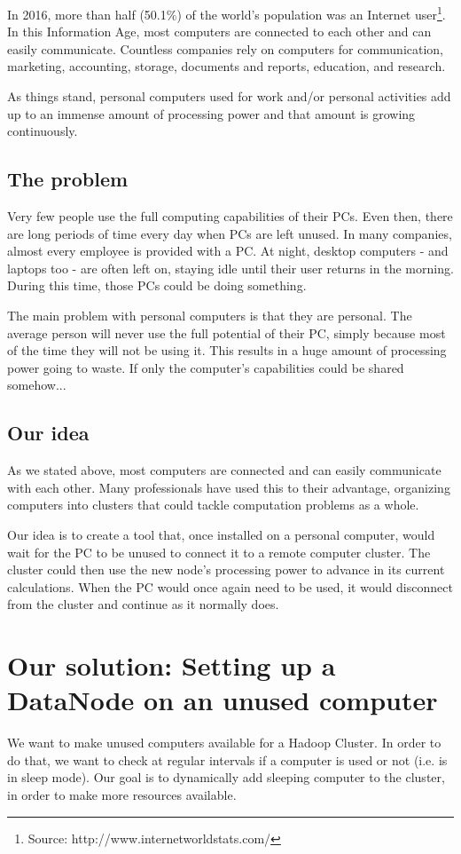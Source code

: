 \documentclass[11pt]{report} %
\begin{document}
In 2016, more than half (50.1\%) of the world's population was an Internet user\footnote{Source: http://www.internetworldstats.com/}. In this Information Age, most computers are connected to each other and can easily communicate. Countless companies rely on computers for communication, marketing, accounting, storage, documents and reports, education, and research.

As things stand, personal computers used for work and/or personal activities add up to an immense amount of processing power and that amount is growing continuously.

\section{The problem}
Very few people use the full computing capabilities of their PCs. Even then, there are long periods of time every day when PCs are left unused. In many companies, almost every employee is provided with a PC. At night, desktop computers - and laptops too - are often left on, staying idle until their user returns in the morning. During this time, those PCs could be doing something.

The main problem with personal computers is that they are personal. The average person will never use the full potential of their PC, simply because most of the time they will not be using it. This results in a huge amount of processing power going to waste. If only the computer's capabilities could be shared somehow...
  
\section{Our idea}
As we stated above, most computers are connected and can easily communicate with each other. Many professionals have used this to their advantage, organizing computers into clusters that could tackle computation problems as a whole.

Our idea is to create a tool that, once installed on a personal computer, would wait for the PC to be unused to connect it to a remote computer cluster. The cluster could then use the new node's processing power to advance in its current calculations. When the PC would once again need to be used, it would disconnect from the cluster and continue as it normally does.

\chapter{Our solution: Setting up a DataNode on an unused computer}
We want to make unused computers available for a Hadoop Cluster. In order to do that, we want to check at regular intervals if a computer is used or not (i.e. is in sleep mode). Our goal is to dynamically add sleeping computer to the cluster, in order to make more resources available.
\end{document}
